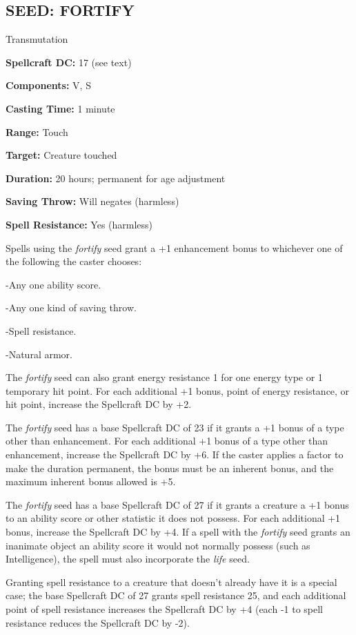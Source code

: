 \documentclass{article}
\begin{document}
\vspace{12pt}
\subsection*{SEED: FORTIFY }

Transmutation 

\textbf{Spellcraft DC:} 17 (see text) 

\textbf{Components:} V, S 

\textbf{Casting Time:} 1 minute 

\textbf{Range:} Touch 

\textbf{Target:} Creature touched

\textbf{Duration:} 20 hours; permanent for age adjustment 

\textbf{Saving Throw:} Will negates (harmless) 

\textbf{Spell Resistance:} Yes (harmless) 

Spells using the \textit{fortify }seed grant a +1 enhancement bonus to whichever 
one of the following the caster chooses: 

-Any one ability score. 

-Any one kind of saving throw. 

-Spell resistance. 

-Natural armor. 

The \textit{fortify }seed can also grant energy resistance 1 for one energy type 
or 1 temporary hit point. For each additional +1 bonus, point of energy resistance, 
or hit point, increase the Spellcraft DC by +2. 

The \textit{fortify }seed has a base Spellcraft DC of 23 if it grants a +1 bonus 
of a type other than enhancement. For each additional +1 bonus of a type other 
than enhancement, increase the Spellcraft DC by +6. If the caster applies a factor 
to make the duration permanent, the bonus must be an inherent bonus, and the maximum 
inherent bonus allowed is +5. 

The \textit{fortify }seed has a base Spellcraft DC of 27 if it grants a creature 
a +1 bonus to an ability score or other statistic it does not possess. For each 
additional +1 bonus, increase the Spellcraft DC by +4. If a spell with the \textit{fortify 
}seed grants an inanimate object an ability score it would not normally possess 
(such as Intelligence), the spell must also incorporate the \textit{life }seed. 

Granting spell resistance to a creature that doesn't already have it is a special 
case; the base Spellcraft DC of 27 grants spell resistance 25, and each additional 
point of spell resistance increases the Spellcraft DC by +4 (each -1 to spell resistance 
reduces the Spellcraft DC by -2).
\end{document}
